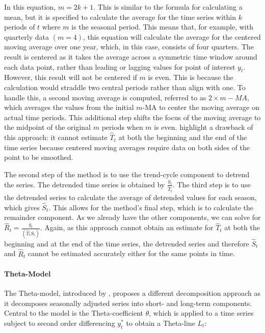 \documentclass[12pt,a4paper]{article}
\begin{document}
In this equation, $m=2k+1$. This is similar to the formula for calculating a mean, but it is specified to calculate the average for the time series within $k$ periods of $t$ where $m$ is the seasonal period. This means that, for example, with quarterly data $(m=4)$, this equation will calculate the average for the centered moving average over one year, which, in this case, consists of four quarters. The result is centered as it takes the average across a symmetric time window around each data point, rather than leading or lagging values for point of interest $y_t$. However, this result will not be centered if $m$ is even. This is because the calculation would straddle two central periods rather than align with one. To handle this, a second moving average is computed, referred to as $2\times m-MA$, which averages the values from the initial $m$-MA to center the moving average on actual time periods. This additional step shifts the focus of the moving average to the midpoint of the original $m$ periods when $m$ is even. \cite{HyndmanForecasting2021} highlight a drawback of this approach: it cannot estimate ${\hat{T}}_t$ at both the beginning and the end of the time series because centered moving averages require data on both sides of the point to be smoothed.

The second step of the method is to use the trend-cycle component to detrend the series. The detrended time series is obtained by $\frac{y_t}{{\hat{T}}_t}$. The third step is to use the detrended series to calculate the average of detrended values for each season, which gives ${\hat{S}}_t$. This allows for the method's final step, which is to calculate the remainder component. As we already have the other components, we can solve for ${\hat{R}}_t=\frac{y_t}{\left({\hat{T}}_t{\hat{S}}_t\right)}$. Again, as this approach cannot obtain an estimate for ${\hat{T}}_t$ at both the beginning and at the end of the time series, the detrended series and therefore ${\hat{S}}_t$ and ${\hat{R}}_t$ cannot be estimated accurately either for the same points in time.

\paragraph{Theta-Model}

The Theta-model, introduced by \cite{ASSIMAKOPOULOS2000}, proposes a different decomposition approach as it decomposes seasonally adjusted series into short- and long-term components. Central to the model is the Theta-coefficient $\theta$, which is applied to a time series subject to second order differencing $y_t^\ast$ to obtain a Theta-line $L_t$:
\end{document}
